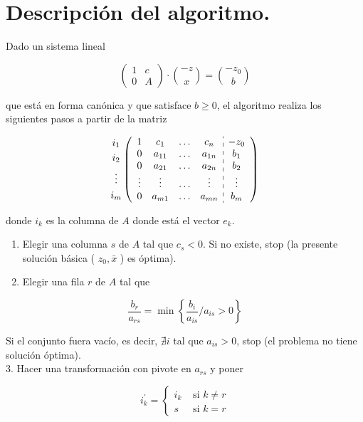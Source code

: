 \documentclass[10pt]{article}
\begin{document}
\section*{Descripción del algoritmo.}
Dado un sistema lineal

$$
\left(\begin{array}{cc}
1 & c \\
0 & A
\end{array}\right) \cdot\binom{-z}{x}=\binom{-z_{0}}{b}
$$

que está en forma canónica y que satisface $b \geq 0$, el algoritmo realiza los siguientes pasos a partir de la matriz

$$
\begin{gathered}
i_{1} \\
i_{2} \\
\vdots \\
i_{m}
\end{gathered}\left(\begin{array}{cccc:c}
1 & c_{1} & \ldots & c_{n} & -z_{0} \\
0 & a_{11} & \ldots & a_{1 n} & b_{1} \\
0 & a_{21} & \ldots & a_{2 n} & b_{2} \\
\vdots & \vdots & \ldots & \vdots & \vdots \\
0 & a_{m 1} & \ldots & a_{m n} & b_{m}
\end{array}\right)
$$

donde $i_{k}$ es la columna de $A$ donde está el vector $e_{k}$.

\begin{enumerate}
  \item Elegir una columna $s$ de $A$ tal que $c_{s}<0$. Si no existe, stop (la presente solución básica ( $z_{0}, \bar{x}$ ) es óptima).
  \item Elegir una fila $r$ de $A$ tal que
\end{enumerate}

$$
\frac{b_{r}}{a_{r s}}=\min \left\{\frac{b_{i}}{a_{i s}} / a_{i s}>0\right\}
$$

Si el conjunto fuera vacío, es decir, $\nexists i$ tal que $a_{i s}>0$, stop (el problema no tiene solución óptima).\\
3. Hacer una transformación con pivote en $a_{r s}$ y poner

$$
i_{k}^{\prime}= \begin{cases}i_{k} & \text { si } k \neq r \\ s & \text { si } k=r\end{cases}
$$
\end{document}
